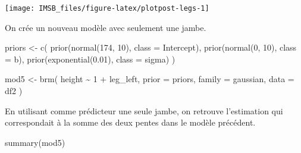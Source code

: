 \documentclass[
  a4paper,11pt,twoside,onecolumn,openright,final,oldfontcommands]{memoir}
\newenvironment{Shaded}{\begin{snugshade}}{\end{snugshade}}
\newcommand{\AttributeTok}[1]{\textcolor[rgb]{0.77,0.63,0.00}{#1}}
\newcommand{\DecValTok}[1]{\textcolor[rgb]{0.00,0.00,0.81}{#1}}
\newcommand{\FloatTok}[1]{\textcolor[rgb]{0.00,0.00,0.81}{#1}}
\newcommand{\FunctionTok}[1]{\textcolor[rgb]{0.00,0.00,0.00}{#1}}
\newcommand{\NormalTok}[1]{#1}
\newcommand{\OtherTok}[1]{\textcolor[rgb]{0.56,0.35,0.01}{#1}}
\newcommand{\SpecialCharTok}[1]{\textcolor[rgb]{0.00,0.00,0.00}{#1}}
\theoremstyle{definition}
\theoremstyle{definition}
\theoremstyle{definition}
\theoremstyle{definition}
\theoremstyle{remark}
\begin{document}
\begin{Shaded}
\end{Shaded}

\begin{center}\texttt{[image: IMSB\_files/figure-latex/plotpost-legs-1]} \end{center}

On crée un nouveau modèle avec seulement une jambe.

\begin{Shaded}
\begin{Highlighting}[]
\NormalTok{priors }\OtherTok{\textless{}{-}} \FunctionTok{c}\NormalTok{(}
  \FunctionTok{prior}\NormalTok{(}\FunctionTok{normal}\NormalTok{(}\DecValTok{174}\NormalTok{, }\DecValTok{10}\NormalTok{), }\AttributeTok{class =}\NormalTok{ Intercept),}
  \FunctionTok{prior}\NormalTok{(}\FunctionTok{normal}\NormalTok{(}\DecValTok{0}\NormalTok{, }\DecValTok{10}\NormalTok{), }\AttributeTok{class =}\NormalTok{ b),}
  \FunctionTok{prior}\NormalTok{(}\FunctionTok{exponential}\NormalTok{(}\FloatTok{0.01}\NormalTok{), }\AttributeTok{class =}\NormalTok{ sigma)}
\NormalTok{  )}

\NormalTok{mod5 }\OtherTok{\textless{}{-}} \FunctionTok{brm}\NormalTok{(}
\NormalTok{  height }\SpecialCharTok{\textasciitilde{}} \DecValTok{1} \SpecialCharTok{+}\NormalTok{ leg\_left,}
  \AttributeTok{prior =}\NormalTok{ priors,}
  \AttributeTok{family =}\NormalTok{ gaussian,}
  \AttributeTok{data =}\NormalTok{ df2}
\NormalTok{  )}
\end{Highlighting}
\end{Shaded}

En utilisant comme prédicteur une seule jambe, on retrouve l'estimation qui correspondait à la somme des deux pentes dans le modèle précédent.

\begin{Shaded}
\begin{Highlighting}[]
\FunctionTok{summary}\NormalTok{(mod5)}
\end{Highlighting}
\end{Shaded}
\end{document}
